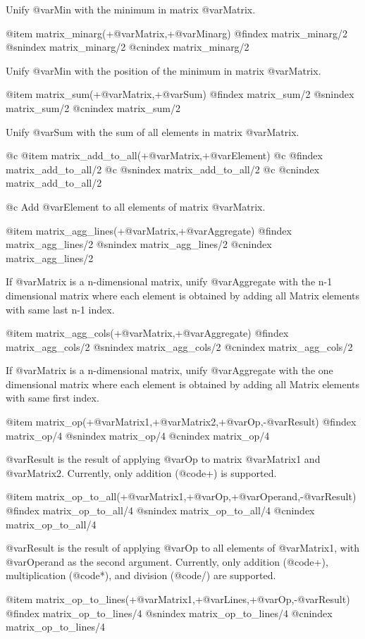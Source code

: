 Unify @var{Min} with the minimum in matrix  @var{Matrix}.

@item matrix_minarg(+@var{Matrix},+@var{Minarg})
@findex matrix_minarg/2
@snindex matrix_minarg/2
@cnindex matrix_minarg/2

Unify @var{Min} with the position of the minimum in matrix  @var{Matrix}.

@item matrix_sum(+@var{Matrix},+@var{Sum})
@findex matrix_sum/2
@snindex matrix_sum/2
@cnindex matrix_sum/2

Unify @var{Sum} with the sum of all elements in matrix  @var{Matrix}.

@c @item matrix_add_to_all(+@var{Matrix},+@var{Element})
@c @findex matrix_add_to_all/2
@c @snindex matrix_add_to_all/2
@c @cnindex matrix_add_to_all/2

@c Add @var{Element} to all elements of matrix  @var{Matrix}.

@item matrix_agg_lines(+@var{Matrix},+@var{Aggregate})
@findex matrix_agg_lines/2
@snindex matrix_agg_lines/2
@cnindex matrix_agg_lines/2

If @var{Matrix} is a n-dimensional matrix, unify @var{Aggregate} with
the n-1 dimensional matrix where each element is obtained by adding all
Matrix elements with same last n-1 index.

@item matrix_agg_cols(+@var{Matrix},+@var{Aggregate})
@findex matrix_agg_cols/2
@snindex matrix_agg_cols/2
@cnindex matrix_agg_cols/2

If @var{Matrix} is a n-dimensional matrix, unify @var{Aggregate} with
the one dimensional matrix where each element is obtained by adding all
Matrix elements with same  first index.

@item matrix_op(+@var{Matrix1},+@var{Matrix2},+@var{Op},-@var{Result})
@findex matrix_op/4
@snindex matrix_op/4
@cnindex matrix_op/4

@var{Result} is the result of applying @var{Op} to matrix @var{Matrix1}
and @var{Matrix2}. Currently, only addition (@code{+}) is supported.

@item matrix_op_to_all(+@var{Matrix1},+@var{Op},+@var{Operand},-@var{Result})
@findex matrix_op_to_all/4
@snindex matrix_op_to_all/4
@cnindex matrix_op_to_all/4

@var{Result} is the result of applying @var{Op} to all elements of
@var{Matrix1}, with @var{Operand} as the second argument. Currently,
only addition (@code{+}), multiplication (@code{*}), and division
(@code{/}) are supported.

@item matrix_op_to_lines(+@var{Matrix1},+@var{Lines},+@var{Op},-@var{Result})
@findex matrix_op_to_lines/4
@snindex matrix_op_to_lines/4
@cnindex matrix_op_to_lines/4

